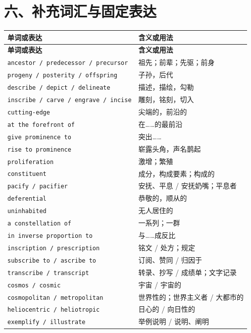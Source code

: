 \documentclass[UTF8,zihao=-4]{ctexart}
\begin{document}
\section*{六、补充词汇与固定表达}

\begin{longtable}{>{\raggedright\arraybackslash}p{5.0cm} >{\raggedright\arraybackslash}p{9.5cm}}
\toprule
\textbf{单词或表达} & \textbf{含义或用法} \\
\midrule
\endfirsthead
\toprule
\textbf{单词或表达} & \textbf{含义或用法} \\
\midrule
\endhead
\texttt{ancestor / predecessor / precursor} & 祖先；前辈；先驱；前身 \\
\texttt{progeny / posterity / offspring} & 子孙，后代 \\
\texttt{describe / depict / delineate} & 描述，描绘，勾勒 \\
\texttt{inscribe / carve / engrave / incise} & 雕刻，铭刻，切入 \\
\texttt{cutting-edge} & 尖端的，前沿的 \\
\texttt{at the forefront of} & 在……的最前沿 \\
\texttt{give prominence to} & 突出…… \\
\texttt{rise to prominence} & 崭露头角，声名鹊起 \\
\texttt{proliferation} & 激增；繁殖 \\
\texttt{constituent} & 成分，构成要素；构成的 \\
\texttt{pacify / pacifier} & 安抚、平息 / 安抚奶嘴；平息者 \\
\texttt{deferential} & 恭敬的，顺从的 \\
\texttt{uninhabited} & 无人居住的 \\
\texttt{a constellation of} & 一系列；一群 \\
\texttt{in inverse proportion to} & 与……成反比 \\
\texttt{inscription / prescription} & 铭文 / 处方；规定 \\
\texttt{subscribe to / ascribe to} & 订阅、赞同 / 归因于 \\
\texttt{transcribe / transcript} & 转录、抄写 / 成绩单；文字记录 \\
\texttt{cosmos / cosmic} & 宇宙 / 宇宙的 \\
\texttt{cosmopolitan / metropolitan} & 世界性的；世界主义者 / 大都市的 \\
\texttt{heliocentric / heliotropic} & 日心的 / 向日性的 \\
\texttt{exemplify / illustrate} & 举例说明 / 说明、阐明 \\

\end{longtable}
\end{document}
